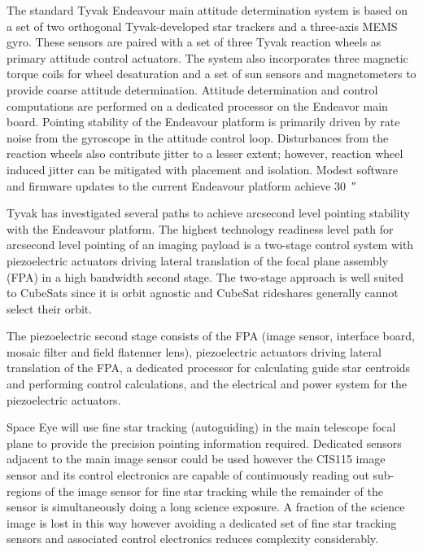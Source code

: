 \documentclass[]{iac}
\begin{document}
The standard Tyvak Endeavour main attitude determination system is based on a set of two orthogonal Tyvak-developed star
trackers and a three-axis MEMS gyro. These sensors are paired with a set of three Tyvak reaction wheels as primary
attitude control actuators. The system also incorporates three magnetic torque coils for wheel desaturation and a set of
sun sensors and magnetometers to provide coarse attitude determination. Attitude determination and control computations
are performed on a dedicated processor on the Endeavor main board. Pointing stability of the Endeavour platform is
primarily driven by rate noise from the gyroscope in the attitude control loop. Disturbances from the reaction wheels
also contribute jitter to a lesser extent; however, reaction wheel induced jitter can be mitigated with placement and
isolation. Modest software and firmware updates to the current Endeavour platform achieve \SI{30}{\arcsecond}

Tyvak has investigated several paths to achieve arcsecond level pointing stability with the Endeavour platform. The
highest technology readiness level path for arcsecond level pointing of an imaging payload is a two-stage control system
with piezoelectric actuators driving lateral translation of the focal plane assembly (FPA) in a high bandwidth second
stage. The two-stage approach is well suited to CubeSats since it is orbit agnostic and CubeSat rideshares generally
cannot select their orbit.

The piezoelectric second stage consists of the FPA (image sensor, interface board, mosaic filter and field flatenner
lens), piezoelectric actuators driving lateral translation of the FPA, a dedicated processor for calculating guide star
centroids and performing control calculations, and the electrical and power system for the piezoelectric actuators.

Space Eye will use fine star tracking (autoguiding) in the main telescope focal plane to provide the precision pointing
information required. Dedicated sensors adjacent to the main image sensor could be used however the CIS115 image sensor
and its control electronics are capable of continuously reading out sub-regions of the image sensor for fine star
tracking while the remainder of the sensor is simultaneously doing a long science exposure. A fraction of the science
image is lost in this way however avoiding a dedicated set of fine star tracking sensors and associated control
electronics reduces complexity considerably.
\end{document}
